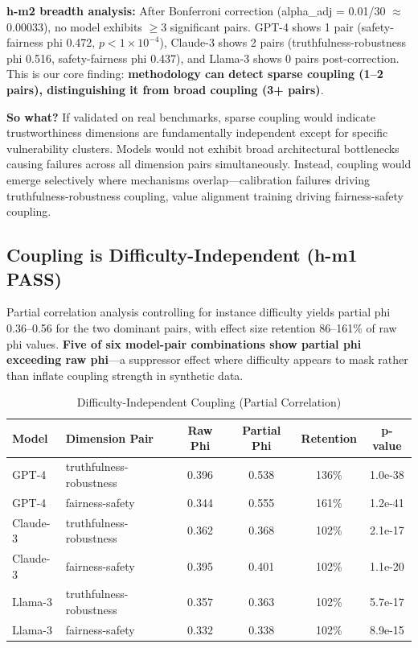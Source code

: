 \textbf{h-m2 breadth analysis:} After Bonferroni correction (alpha\_adj = 0.01/30 $\approx$ 0.00033), no model exhibits $\geq$3 significant pairs. GPT-4 shows 1 pair (safety-fairness phi 0.472, $p < 1\times10^{-4}$), Claude-3 shows 2 pairs (truthfulness-robustness phi 0.516, safety-fairness phi 0.437), and Llama-3 shows 0 pairs post-correction. This is our core finding: \textbf{methodology can detect sparse coupling (1--2 pairs), distinguishing it from broad coupling (3+ pairs)}.

\textbf{So what?} If validated on real benchmarks, sparse coupling would indicate trustworthiness dimensions are fundamentally independent except for specific vulnerability clusters. Models would not exhibit broad architectural bottlenecks causing failures across all dimension pairs simultaneously. Instead, coupling would emerge selectively where mechanisms overlap---calibration failures driving truthfulness-robustness coupling, value alignment training driving fairness-safety coupling.

\subsection{Coupling is Difficulty-Independent (h-m1 PASS)}

Partial correlation analysis controlling for instance difficulty yields partial phi 0.36--0.56 for the two dominant pairs, with effect size retention 86--161\% of raw phi values. \textbf{Five of six model-pair combinations show partial phi exceeding raw phi}---a suppressor effect where difficulty appears to mask rather than inflate coupling strength in synthetic data.

\begin{table}[h]
\centering
\caption{Difficulty-Independent Coupling (Partial Correlation)}
\begin{tabular}{llcccc}
\toprule
Model & Dimension Pair & Raw Phi & Partial Phi & Retention & p-value \\
\midrule
GPT-4 & truthfulness-robustness & 0.396 & 0.538 & 136\% & 1.0e-38 \\
GPT-4 & fairness-safety & 0.344 & 0.555 & 161\% & 1.2e-41 \\
Claude-3 & truthfulness-robustness & 0.362 & 0.368 & 102\% & 2.1e-17 \\
Claude-3 & fairness-safety & 0.395 & 0.401 & 102\% & 1.1e-20 \\
Llama-3 & truthfulness-robustness & 0.357 & 0.363 & 102\% & 5.7e-17 \\
Llama-3 & fairness-safety & 0.332 & 0.338 & 102\% & 8.9e-15 \\
\bottomrule
\end{tabular}
\label{tab:partial_phi}
\end{table}


